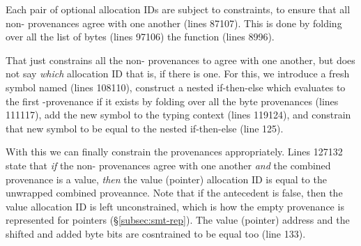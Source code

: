 Each pair of optional allocation IDs are subject to constraints, to ensure that
all non- provenances agree with one another (lines
87\textendash{}107). This is done by folding over all the list of bytes (lines
97\textendash{}106) the  function (lines
89\textendash{}96).


That just constrains all the non- provenances to agree
with one another, but does not say \emph{which} allocation ID that is, if there
is one. For this, we introduce a fresh symbol named 
(lines 108\textendash{}110), construct a nested if-then-else which evaluates to
the first -provenance if it exists by folding over all
the byte provenances (lines 111\textendash{}117), add the new symbol to the
typing context (lines 119\textendash{}124), and constrain that new symbol to be
equal to the nested if-then-else (line 125).


With this we can finally constrain the provenances appropriately. Lines
127\textendash{}132 state that \emph{if} the non-
provenances agree with one another \emph{and} the combined provenance is a
 value, \emph{then} the value (pointer) allocation ID is
equal to the unwrapped combined proveannce. Note that if the antecedent is
false, then the value allocation ID is left unconstrained, which is how the
empty provenance is represented for pointers (\S\ref{subsec:smt-rep}). The value
(pointer) address and the shifted and added byte bits are cosntrained to be
equal too (line 133).




